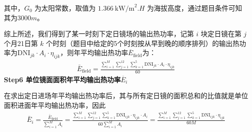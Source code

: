 \documentclass[../main.tex]{subfiles}
\begin{document}
\par 其中，$G_0$ 为太阳常数，取值为 \(1.366\ \text{kW/m}^2\).$H$ 为海拔高度，通过题目条件可知其为$3000m$。 
\par 综上所述，我们得到了某一时刻下定日镜场的输出热功率，记第 \(i\) 块定日镜在第 \(j\) 个月21日第 \(k\) 个时刻（题目中给定的5个时刻按从早到晚的顺序排列）的输出热功率为$ \text{DNI}_{jk} \cdot A_i \cdot \eta_{ijk}$，则年平均输出热功率$\overline{E}_{\text{field}}$为：
\begin{align}\label{1.51}
  \bar{E}_{\text{field}} = \frac{\sum_{i=1}^{M} \sum_{j=1}^{12} \sum_{k=1}^{5} \text{DNI}_{jk} \cdot A_i \cdot \eta_{ijk}}{60}
\end{align}
\noindent \textbf{Step6 单位镜面面积年平均输出热功率$\overline{E}_{i}$}
\par 在求出定日进场年平均输出热功率后，其与所有定日镜的面积总和的比值就是单位面积进面年平均输出热功率，因此
\begin{align}\label{1.52}
  \bar{E}_i = \frac{\bar{E}_{\text{field}}}{\sum_{i=1}^{M} A_i} =\frac{\sum_{i=1}^{M} \sum_{j=1}^{12} \sum_{k=1}^{5} \text{DNI}_{ijk} \cdot \eta_{ijk} \cdot A_i}{60 \sum_{i=1}^{M} A_i}=\frac{\sum_{i=1}^{M} \sum_{j=1}^{12} \sum_{k=1}^{5} \text{DNI}_{ijk} \cdot \eta_{ijk}}{60M} 
\end{align}
\end{document}
